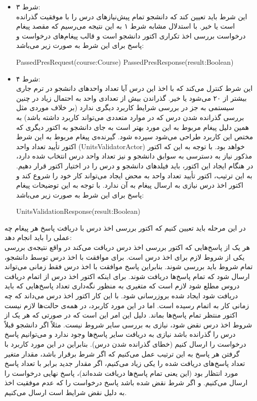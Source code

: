 \begin{itemize}
\item شرط ۳:\\
 این شرط باید تعیین کند که دانشجو تمام پیش‌نیازهای درس را با موفقیت گذرانده است یا خیر. با استدلال مشابه شرط ۱ به این نتیجه می‌رسیم که مقصد پیغام درخواست بررسی اخذ تکراری اکتور دانشجو است و قالب پیغام‌های درخواست و پاسخ برای این شرط به صورت زیر می‌باشد:
 \begin{latin}
 PassedPresRequest(course:Course)
 PassedPresResponse(result:Boolean)
 \end{latin}
 
\item شرط ۴:\\
 این شرط کنترل می‌کند که با اخذ این درس آیا تعداد واحدهای دانشجو در ترم جاری بیشتر از ۲۰ می‌شود یا خیر. گذراندن بیش از تعدادی واحد به احتمال زیاد در چنین سیستمی به جز در بررسی شرایط کاربرد دیگری ندارد (بر خلاف موردی مثل بررسی گذرانده شدن درس که در موارد متعددی می‌تواند کاربرد داشته باشد) به همین دلیل پیغام مربوط به این مورد بهتر است به جای دانشجو به اکتور دیگری که مختص این کاربرد طراحی می‌شود سپرده شود. گیرنده‌ی پیغام مربوط به این شرط اکتور تأیید تعداد واحد (UnitsValidatorActor)  خواهد بود. با توجه به این که اکتور مذکور نیاز به دسترسی به سوابق دانشجو و نیز تعداد واحد درس انتخاب شده دارد، در هنگام ایجاد این اکتور، باید فیلد‌های دانشجو و درس را در اختیار اکتور قرار دهیم. به این ترتیب، اکتور تأیید تعداد واحد به محض ایجاد می‌تواند کار خود را شروع کند و  اکتور اخذ درس نیازی به ارسال پیغام به آن ندارد. با توجه به این توضیحات پیغام‌ پاسخ برای این شرط به صورت زیر می‌باشد:
 \begin{latin}
  UnitsValidationResponse(result:Boolean)
 \end{latin}
\end{itemize}
در این مرحله باید تعیین کنیم که اکتور بررسی اخذ درس با دریافت پاسخ هر پیغام چه عملی را باید انجام دهد:\\
هر یک از پاسخ‌هایی که اکتور بررسی اخذ درس دریافت می‌کند در واقع نتیجه‌ی بررسی یکی از شروط لازم برای اخذ درس است. برای موافقت با اخذ درس توسط دانشجو، تمام شروط باید بررسی شوند. بنابراین پاسخ موافقت با اخذ درس فقط زمانی می‌تواند ارسال شود که تمام پاسخ‌ها دریافت شوند. برای اینکه اکتور اخذ درس از اتمام دریافت دروس مطلع شود لازم است که متغیری به منظور نگه‌داری تعداد پاسخ‌هایی که باید دریافت شود ایجاد شده بروزرسانی شود. با این کار اکتور اخذ درس می‌داند که چه زمانی کار به اتمام رسیده است. اما در این مورد کاربرد، در همه‌ی حالت‌ها لازم نیست اکتور منتظر تمام پاسخ‌ها بماند. دلیل این امر این است که در صورتی که هر یک از شروط اخذ درس نقض شود، نیازی به بررسی سایر شروط نیست. مثلاً اگر دانشجو قبلاً درس را گذرانده باشد نیازی به دریافت سایر پاسخ‌ها وجود ندارد و می‌توانیم پاسخ درخواست را ارسال کنیم (خطای گذرانده شدن درس). بنابراین در این مورد کاربرد با گرفتن هر پاسخ به این ترتیب عمل می‌کنیم که اگر شرط برقرار باشد، مقدار متغیر تعداد پاسخ‌های دریافت شده را یکی زیاد می‌کنیم، اگر مقدار جدید برابر با تعداد پاسخ مورد انتظار بود (این یعنی تمام پاسخ‌ها دریافت شده‌اند)، پاسخ نهایی درخواست را ارسال می‌کنیم. و اگر شرط نقض شده باشد پاسخ درخواست را که عدم موفقیت اخذ به دلیل نقض شرایط است ارسال می‌کنیم.
